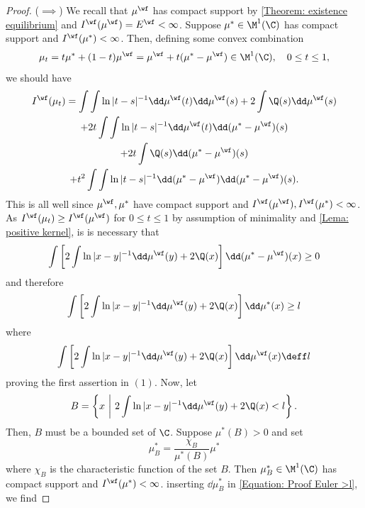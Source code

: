 \begin{proof}
	($\implies$) We recall that $\mu^\wf$ has compact support by \autoref{Theorem: existence equilibrium} and $I^\wf(\mu^\wf) = E^\wf < \infty$. Suppose $\mu^* \in \M^1(\C)$ has compact support and $I^\wf(\mu^*) < \infty$. Then, defining some convex combination
	\begin{equation}
		\mu_t = t \mu^* + (1-t) \mu^\wf = \mu^\wf + t (\mu^* - \mu^\wf) \in \M^1(\C), \quad 0 \leq t \leq 1,
	\end{equation}
	we should have
	\begin{multline}
		I^\wf(\mu_t) = \int \int \ln |t - s|^{-1} \dd \mu^\wf(t) \dd \mu^\wf(s) + 2 \int \Q(s) \dd  \mu^\wf(s) \\
		+ 2t \int \int \ln |t - s|^{-1} \dd \mu^\wf(t) \dd (\mu^* - \mu^\wf)(s) \\
		+ 2t  \int \Q(s) \dd  (\mu^* - \mu^\wf) (s) \\
		+ t^2 \int \int \ln |t - s|^{-1} \dd (\mu^* - \mu^\wf) \dd (\mu^* - \mu^\wf)(s).
	\end{multline}
	This is all well since $\mu^\wf, \mu^*$ have compact support and $I^\wf (\mu^\wf), I^\wf(\mu^*) < \infty$. As $I^\wf(\mu_t) \geq I^\wf (\mu^\wf)$ for $0 \leq t \leq 1$ by assumption of minimality and \autoref{Lema: positive kernel}, is is necessary that
	\begin{equation}
		\int \left[ 2 \int \ln{|x-y|^{-1}} \dd \mu^\wf(y) + 2 \Q(x) \right] \dd (\mu^* - \mu^\wf)(x) \geq 0
		\label{Equation: Proof Euler >0}
	\end{equation}   
	and therefore
	\begin{equation}
		\int \left[ 2 \int \ln{|x-y|^{-1}} \dd \mu^\wf(y) + 2 \Q(x) \right] \dd \mu^*(x) \geq l
		\label{Equation: Proof Euler >l}
	\end{equation}
	where
	\begin{equation}
		\int \left[ 2 \int \ln{|x-y|^{-1}} \dd \mu^\wf(y) + 2 \Q(x) \right] \dd \mu^\wf(x) \deff l
	\end{equation}
	proving the first assertion in $(1)$. Now, let
	\begin{equation}
		B = \left\{ x \ \bigg| \ 2 \int \ln{|x-y|^{-1}} \dd \mu^\wf(y) + 2 \Q(x) < l \right\}.
	\end{equation}
	Then, $B$ must be a bounded set of $\C$. Suppose $\mu^*(B) > 0$ and set
	\begin{equation}
		\mu^*_B = \frac{\chi_B}{\mu^*(B)} \mu^*
	\end{equation}
	where $\chi_B$ is the characteristic function of the set $B$. Then $\mu^*_B \in \M^1(\C)$ has compact support and $I^\wf(\mu^*) < \infty$. inserting $\dd \mu^*_B$ in \autoref{Equation: Proof Euler >l}, we find

\end{proof}
